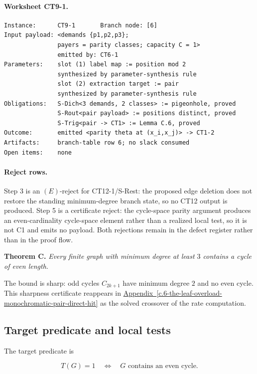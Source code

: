 \documentclass[
  11pt,
]{article}
\theoremstyle{definition}
\newcommand{\appref}[1]{\hyperref[#1]{Appendix~\ref*{#1}}}
\begin{document}
\paragraph{Worksheet CT9-1.}
\begingroup
\small
\begin{verbatim}
Instance:      CT9-1       Branch node: [6]
Input payload: <demands {p1,p2,p3};
               payers = parity classes; capacity C = 1>
               emitted by: CT6-1
Parameters:    slot (1) label map := position mod 2
               synthesized by parameter-synthesis rule
               slot (2) extraction target := pair
               synthesized by parameter-synthesis rule
Obligations:   S-Dich<3 demands, 2 classes> := pigeonhole, proved
               S-Rout<pair payload> := positions distinct, proved
               S-Trig<pair -> CT1> := Lemma C.6, proved
Outcome:       emitted <parity theta at (x_i,x_j)> -> CT1-2
Artifacts:     branch-table row 6; no slack consumed
Open items:    none
\end{verbatim}
\endgroup

\paragraph{Reject rows.}
Step 3 is an \((E)\)-reject for CT12-1/S-Rest: the proposed edge deletion
does not restore the standing minimum-degree branch state, so no CT12
output is produced. Step 5 is a certificate reject: the cycle-space
parity argument produces an even-cardinality cycle-space element rather
than a realized local test, so it is not C1 and emits no payload. Both
rejections remain in the defect register rather than in the proof flow.

\textbf{Theorem C.} \emph{Every finite graph with minimum degree at
least \(3\) contains a cycle of even length.}

The bound is sharp: odd cycles \(C_{2k+1}\) have minimum degree \(2\)
and no even cycle. This sharpness certificate reappears in \appref{c.6-the-leaf-overload-monochromatic-pair-direct-hit}
as the solved crossover of the rate computation.

\subsection{Target predicate and local
tests}\label{c.1-target-predicate-and-local-tests}

The target predicate is

\[
T(G)=1
\quad\Longleftrightarrow\quad
G\text{ contains an even cycle}.
\]
\end{document}
